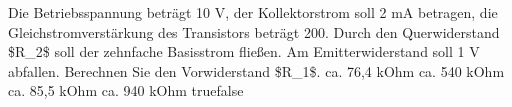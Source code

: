     {Die Betriebsspannung beträgt 10 V, der Kollektorstrom soll 2 mA betragen, die Gleichstromverstärkung des Transistors beträgt 200. Durch den Querwiderstand \$R\_2\$ soll der zehnfache Basisstrom fließen. Am Emitterwiderstand soll 1 V abfallen. Berechnen Sie den Vorwiderstand \$R\_1\$.}
    {ca. 76,4 kOhm}
    {ca. 540 kOhm}
    {ca. 85,5 kOhm}
    {ca. 940 kOhm}
    {true}{false}